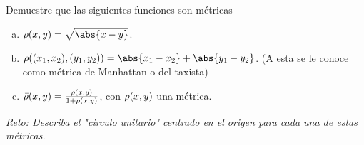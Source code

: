 \begin{ejercicio}
	Demuestre que las siguientes funciones son métricas
	\begin{enumerate}[a)]
		\item $\metric{x}{y} = \sqrt{\abs{x - y}}$.
		\item $\metric{(x_1 ,x_2)}{(y_1 ,y_2)} = \abs{x_1 - x_2} + \abs{y_1 - y_2}$. (A esta se le conoce como métrica de Manhattan o del taxista)
		\item $\bar{\rho} (x,y) = \frac{\rho(x,y)}{1 + \rho(x,y)}$, con $\rho(x,y)$ una métrica.
	\end{enumerate}
	\textit{Reto: Describa el "circulo unitario" centrado en el origen para cada una de estas métricas.}
\end{ejercicio}











